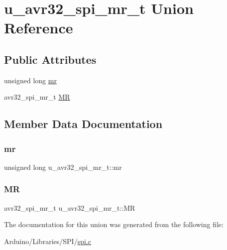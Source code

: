 \hypertarget{unionu__avr32__spi__mr__t}{}\section{u\+\_\+avr32\+\_\+spi\+\_\+mr\+\_\+t Union Reference}
\label{unionu__avr32__spi__mr__t}
\subsection*{Public Attributes}
\begin{DoxyCompactItemize}
\item 
unsigned long \hyperlink{unionu__avr32__spi__mr__t_a41d02dda543e9815d378a405aa5410ec}{mr}
\item 
avr32\+\_\+spi\+\_\+mr\+\_\+t \hyperlink{unionu__avr32__spi__mr__t_ad47c020f6ca59919bf2571ec941db436}{MR}
\end{DoxyCompactItemize}


\subsection{Member Data Documentation}
\mbox{\label{unionu__avr32__spi__mr__t_a41d02dda543e9815d378a405aa5410ec}} 
\subsubsection{\texorpdfstring{mr}{mr}}
{\footnotesize\ttfamily unsigned long u\+\_\+avr32\+\_\+spi\+\_\+mr\+\_\+t\+::mr}

\mbox{\label{unionu__avr32__spi__mr__t_ad47c020f6ca59919bf2571ec941db436}} 
\subsubsection{\texorpdfstring{MR}{MR}}
{\footnotesize\ttfamily avr32\+\_\+spi\+\_\+mr\+\_\+t u\+\_\+avr32\+\_\+spi\+\_\+mr\+\_\+t\+::\+MR}



The documentation for this union was generated from the following file\+:\begin{DoxyCompactItemize}
\item 
Arduino/\+Libraries/\+S\+P\+I/\hyperlink{spi_8c}{spi.\+c}\end{DoxyCompactItemize}
